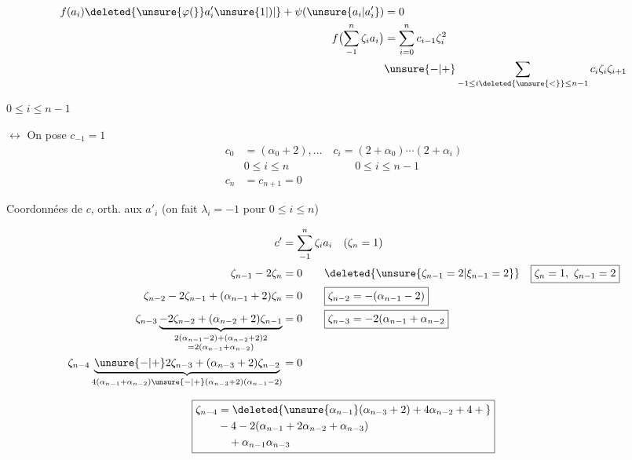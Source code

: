 \[
\begin{aligned}
f(a_i)\deleted{\unsure{\varphi(}}a'_i\unsure{1|)|{}}+\psi(\unsure{a_i|a'_i})&=0\\
f\bigl(\sum_{-1}^{n}\zeta_i a_i\bigr)&=\sum_{i=0}^{n}c_{i-1}\zeta_i^2\\
&\unsure{-|+}\sum_{-1\le i\deleted{\unsure{<}}\le n-1}c_i\zeta_i\zeta_{i+1}
\end{aligned}
\]

 \quad $0\le i\le n-1$

$\longleftrightarrow$ On pose  $c_{-1}=1$
\[
\begin{aligned}
c_0&=(\alpha_0+2),\ldots\quad c_i=(2+\alpha_0)\cdots(2+\alpha_i)\\
&0\le i\le n\hspace{6em}0\le i\le n-1\\
c_n&=c_{n+1}=0
\end{aligned}
\]

Coordonnées  de $c$, orth. aux $a'_i$ (on fait $\lambda_i=-1$ pour $0\le i\le n$)

\[
\begin{aligned}
c'&=\sum_{-1}^{n}\zeta_i a_i\quad(\zeta_n=1)\\
\zeta_{n-1}-2\zeta_n&=0\qquad\deleted{\unsure{\zeta_{n-1}=2|\xi_{n-1}=2}}\quad\boxed{\zeta_n=1,\ \zeta_{n-1}=2}\\
\zeta_{n-2}-2\zeta_{n-1}+(\alpha_{n-1}+2)\zeta_n&=0\qquad\boxed{\zeta_{n-2}=-(\alpha_{n-1}-2)}\\
\zeta_{n-3}\underbrace{-2\zeta_{n-2}+(\alpha_{n-2}+2)\zeta_{n-1}}_{\substack{2(\alpha_{n-1}-2)+(\alpha_{n-2}+2)2\\=2(\alpha_{n-1}+\alpha_{n-2})}}&=0
\qquad\boxed{\zeta_{n-3}=-2(\alpha_{n-1}+\alpha_{n-2}}\\
\zeta_{n-4}\underbrace{\unsure{-|+}2\zeta_{n-3}+(\alpha_{n-3}+2)\zeta_{n-2}}_{4(\alpha_{n-1}+\alpha_{n-2})\unsure{-|+}(\alpha_{n-3}+2)(\alpha_{n-1}-2)}&=0
\end{aligned}
\]

\[
\boxed{\begin{aligned}
\zeta_{n-4}&=\deleted{\unsure{\alpha_{n-1}}(\alpha_{n-3}+2)+4\alpha_{n-2}+4+{}}\\
&-4-2(\alpha_{n-1}+2\alpha_{n-2}+\alpha_{n-3})\\
&\quad+\alpha_{n-1}\alpha_{n-3}
\end{aligned}}
\]

